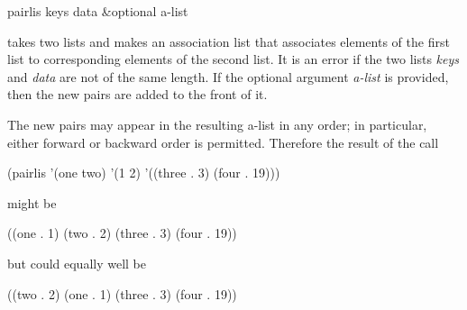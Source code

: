 \begin{defun}[Function]
pairlis keys data &optional a-list

 takes two lists and makes an association list that associates
elements of the first list to corresponding elements of the second
list.  It is an error if the two lists {\it keys} and {\it data} are not of
the same length.  If the optional argument {\it a-list} is provided, then the
new pairs are added to the front of it.

The new pairs may appear in the resulting a-list in any order;
in particular, either forward or backward order is permitted.
Therefore the result of the call
\begin{lisp}
(pairlis '(one two) '(1 2) '((three . 3) (four . 19)))
\end{lisp}
might be
\begin{lisp}
((one . 1) (two . 2) (three . 3) (four . 19))
\end{lisp}
but could equally well be
\begin{lisp}
((two . 2) (one . 1) (three . 3) (four . 19))
\end{lisp}
\end{defun}

